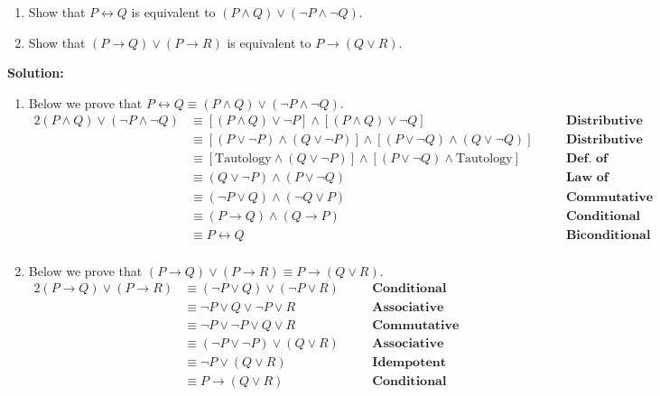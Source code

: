 \begin{enumerate}[label=(\alph*)]
    \item Show that $P \leftrightarrow Q$ is equivalent to $(P \wedge Q) \vee (\neg P \wedge \neg Q)$.
    \item Show that $(P \rightarrow Q) \vee (P \rightarrow R)$ is equivalent to $P \rightarrow (Q \vee R)$.
\end{enumerate}
\textbf{Solution:}
\begin{enumerate}[label=(\alph*)]
    \item Below we prove that $P \leftrightarrow Q \equiv (P \wedge Q) \vee (\neg P \wedge \neg Q)$.
    \begin{alignat*}{2}
        (P \wedge Q) \vee (\neg P \wedge \neg Q) &\equiv [(P \wedge Q) \vee \neg P] \wedge [(P \wedge Q) \vee \neg Q] && \quad \textbf{Distributive Law}\\
        &\equiv [(P \vee \neg P) \wedge (Q \vee \neg P)] \wedge [(P \vee \neg Q) \wedge (Q \vee \neg Q)] && \quad \textbf{Distributive Law}\\
        &\equiv [\text{Tautology} \wedge (Q \vee \neg P)] \wedge [(P \vee \neg Q) \wedge \text{Tautology}] && \quad \textbf{Def. of Tautology}\\
        &\equiv (Q \vee \neg P) \wedge (P \vee \neg Q) && \quad \textbf{Law of Tautology}\\
        &\equiv (\neg P \vee Q) \wedge (\neg Q \vee P) && \quad \textbf{Commutative Law}\\
        &\equiv (P \rightarrow Q) \wedge (Q \rightarrow P) && \quad \textbf{Conditional Law}\\
        &\equiv P \leftrightarrow Q && \quad \textbf{Biconditional Law}\\
    \end{alignat*}
    
    \item Below we prove that $(P \rightarrow Q) \vee (P \rightarrow R) \equiv P \rightarrow (Q \vee R)$.
    \begin{alignat*}{2}
        (P \rightarrow Q) \vee (P \rightarrow R) &\equiv (\neg P \vee Q) \vee (\neg P \vee R) && \quad \textbf{Conditional Law}\\
        &\equiv \neg P \vee Q \vee \neg P \vee R && \quad \textbf{Associative Law}\\
        &\equiv \neg P \vee \neg P \vee Q \vee R && \quad \textbf{Commutative Law}\\
        &\equiv (\neg P \vee \neg P) \vee (Q \vee R) && \quad \textbf{Associative Law}\\
        &\equiv \neg P \vee (Q \vee R) && \quad \textbf{Idempotent Law}\\
        &\equiv P \rightarrow (Q \vee R) && \quad \textbf{Conditional Law}\\
    \end{alignat*}
\end{enumerate}
\pagebreak